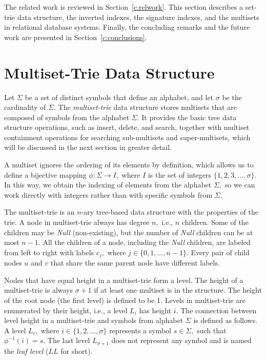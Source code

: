 \documentclass[algorithms,article,accept,pdftex,moreauthors]{Definitions/mdpi}
\begin{document}
The related work is reviewed in Section~\ref{c:relwork}. This section describes a set-trie data structure, the inverted indexes, the signature indexes, and the multisets in relational database systems. Finally, the concluding remarks and the future work are presented in Section~\ref{c:conclusions}.

%
%
\section{Multiset-Trie Data Structure} \label{c:description}
%
Let $\Sigma$ be a set of distinct symbols that define an alphabet, and let 
$\sigma$ be the cardinality of $\Sigma.$ The \emph{multiset-trie} data structure 
stores multisets that are composed of symbols from the alphabet $\Sigma.$ It 
provides the basic tree data structure operations, such as insert, delete, and 
search, together with multiset containment operations for searching sub-multisets
and super-multisets, which will be discussed in the next section in greater detail.

A multiset ignores the ordering of its elements by definition, which allows us to 
define a bijective mapping $\phi:\Sigma \rightarrow I,$ where $I$ is the set of 
integers $\{ 1,2,3, \ldots, \sigma \}.$ In this way, we obtain the indexing of 
elements from the alphabet $\Sigma,$ so we can work directly with integers 
rather than with specific symbols from $\Sigma.$

The multiset-trie is an $n$-ary tree-based data structure with the properties of 
the trie. A node in multiset-trie always has degree $n,$ i.e., $n$ children. Some of 
the children may be \emph{Null} (non-existing), but the number of \emph{Null} 
children can be at most $n-1.$ All the children of a node, including the \emph{Null} 
children, are labeled from left to right with labels $c_j,$ where $j\in \{ 0, 1, \ldots, n-1 \}.$ 
Every pair of child nodes $u$ and $v$ that share the same parent node have different labels.


Nodes that have equal height in a multiset-trie form a level. The height of a 
multiset-trie is always $\sigma+1$ if at least one multiset is in the structure. 
The height of the root node (the first level) is defined to be 1.
%
Levels in multiset-trie are enumerated by their height, i.e., a level $L_i$ has 
height $i.$ The connection between level height in a multiset-trie and symbols 
from alphabet $\Sigma$ is defined as follows. A level $L_i,$ where 
$i\in\{ 1,2,\ldots, \sigma \}$ represents a symbol $s\in\Sigma,$ such that 
$\phi^{-1}(i) = s.$ The last level $L_{\sigma+1}$ does not represent any symbol 
and is named the \emph{leaf level} ($LL$ for short).
\end{document}

